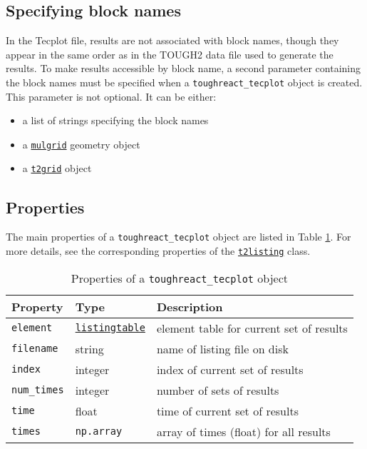 \subsection{Specifying block names}
\label{toughreact_tecplot_blocknames}

In the Tecplot file, results are not associated with block names, though they appear in the same order as in the TOUGH2 data file used to generate the results. To make results accessible by block name, a second parameter containing the block names must be specified when a \texttt{toughreact\_tecplot} object is created. This parameter is not optional. It can be either:

\begin{itemize}
\item a list of strings specifying the block names
\item a \hyperref[mulgrids]{\texttt{mulgrid}} geometry object
\item a \hyperref[t2grids]{\texttt{t2grid}} object
\end{itemize}

\subsection{Properties}

The main properties of a \texttt{toughreact\_tecplot} object are listed in Table \ref{tb:toughreact_tecplot_properties}. For more details, see the corresponding properties of the \hyperref[t2listing_properties]{\texttt{t2listing}} class.

\begin{table}
  \begin{center}
    \begin{tabular}{|l|l|p{70mm}|}
      \hline
      \textbf{Property} & \textbf{Type} & \textbf{Description}\\
      \hline
      \texttt{element} & \hyperref[listingtableobjects]{\texttt{listingtable}} & element table for current set of results\\
      \texttt{filename} & string & name of listing file on disk\\
      \texttt{index} & integer & index of current set of results\\
      \texttt{num\_times} & integer & number of sets of results\\
      \texttt{time} & float & time of current set of results\\
      \texttt{times} & \texttt{np.array} & array of times (float) for all results\\
      \hline
    \end{tabular}
    \caption{Properties of a \texttt{toughreact\_tecplot} object}
    \label{tb:toughreact_tecplot_properties}
  \end{center}
\end{table}

